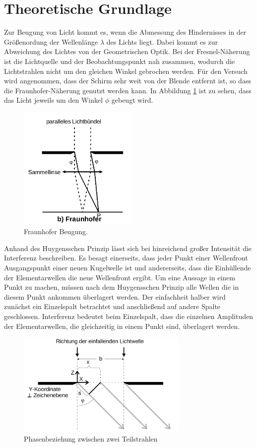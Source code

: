 \section{Theoretische Grundlage}
\label{sec:Theorie}
Zur Beugung von Licht kommt es, wenn die Abmessung des Hindernisses in der Größenordung der Wellenlänge $\lambda$ des Lichts liegt. Dabei kommt es zur Abweichung des Lichtes von der Geometrischen Optik. Bei der Fresnel-Näherung ist die Lichtquelle und der Beobachtungspunkt nah zusammen, wodurch die Lichtstrahlen nicht um den gleichen Winkel gebrochen werden. Für den Versuch wird angenommen, dass der Schirm sehr weit von der Blende entfernt ist, so dass die Fraunhofer-Näherung genutzt werden kann. In Abbildung \ref{fig:Fra} ist zu sehen, dass das Licht jeweils um den Winkel $\phi$ gebeugt wird.
\begin{figure}
  \centering
  \includegraphics[height=6cm]{picture/Frauenhofer.png}
  \caption{Fraunhofer Beugung. \cite[1]{sample}}
  \label{fig:Fra}
\end{figure}
Anhand des Huygensschen Prinzip lässt sich bei hinreichend großer Intensität die Interferenz beschreiben. Es besagt einerseits, dass jeder Punkt einer Wellenfront Ausgangspunkt einer neuen Kugelwelle ist und andererseits, dass die Einhüllende der Elementarwellen die neue Wellenfront ergibt. Um eine Aussage in einem Punkt zu machen, müssen nach dem Huygensschen Prinzip alle Wellen die in diesem Punkt ankommen überlagert werden. Der einfachheit halber wird zunächst ein Einzelspalt betrachtet und anschließend auf andere Spalte geschlossen. Interferenz bedeutet beim Einzelspalt, dass die einzelnen Amplituden der Elementarwellen, die gleichzeitig in einem Punkt sind, überlagert werden.
\begin{figure}
  \centering
  \includegraphics[height=5cm]{picture/doppelspalt.png}
  \caption{Phasenbeziehung zwischen zwei Teilstrahlen \cite[3]{sample}}
  \label{fig:dop}
\end{figure}
